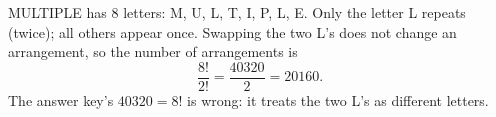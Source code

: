 MULTIPLE has $8$ letters: M, U, L, T, I, P, L, E. Only the letter L repeats (twice); all others appear once. Swapping the two L's does not change an arrangement, so the number of arrangements is
\[
\dfrac{8!}{2!}=\dfrac{40320}{2}=\boxed{20160}.
\]
The answer key's $40320=8!$ is wrong: it treats the two L's as different letters.
